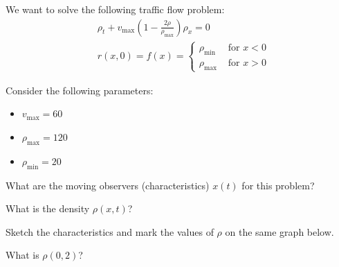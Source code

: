 \begin{slide}
\question \label{traffic:red}

\begin{problem}

We want to solve the following traffic flow problem:
\begin{align*}	
	& \rho_t + v_{\max} \left( 1 - \frac{2 \rho}{\rho_{\max}}\right) \rho_x = 0  \tag{Traffic flow model} \\
	& r(x,0) = f(x) = 
		\begin{cases}
			\rho_{\min}	& \text{ for } x<0\\
			\rho_{\max}	& \text{ for } x>0
		\end{cases}
\end{align*}

Consider the following parameters: 
\begin{itemize}
	\item $v_{\max}=60$
	\item $\rho_{\max} = 120$
	\item $\rho_{\min} = 20$
\end{itemize}
\end{problem}


\begin{parts}
	\item What are the moving observers (characteristics) $x(t)$ for this problem?
	\item What is the density $\rho(x,t)$?
	\item Sketch the characteristics and mark the values of $\rho$ on the same graph below.
	
	\begin{center}
	\end{center}

	
	\item What is $\rho(0,2)$?
\end{parts}

	
\end{slide}





